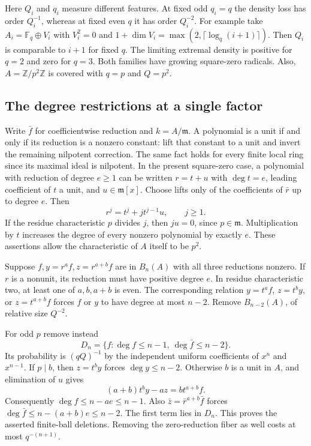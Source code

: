 Here $Q_i$ and $q_i$ measure different features. At fixed odd $q_i=q$ the density loss has order $Q_i^{-1}$, whereas at fixed even $q$ it has order $Q_i^{-2}$. For example take $A_i=\mathbb F_q\oplus V_i$ with $V_i^2=0$ and $1+\dim V_i=\max(2,\lceil\log_q(i+1)\rceil)$. Then $Q_i$ is comparable to $i+1$ for fixed $q$. The limiting extremal density is positive for $q=2$ and zero for $q=3$. Both families have growing square-zero radicals. Also, $A=\mathbb Z/p^2\mathbb Z$ is covered with $q=p$ and $Q=p^2$.

\subsection{The degree restrictions at a single factor}
Write $\bar f$ for coefficientwise reduction and $k=A/\mathfrak m$. A polynomial is a unit if and only if its reduction is a nonzero constant: lift that constant to a unit and invert the remaining nilpotent correction. The same fact holds for every finite local ring since its maximal ideal is nilpotent. In the present square-zero case, a polynomial with reduction of degree $e\ge1$ can be written $r=t+u$ with $\deg t=e$, leading coefficient of $t$ a unit, and $u\in\mathfrak m[x]$. Choose lifts only of the coefficients of $\bar r$ up to degree $e$. Then
\[
              r^j=t^j+j t^{j-1}u,\qquad j\ge1 .
\]
If the residue characteristic $p$ divides $j$, then $ju=0$, since $p\in\mathfrak m$. Multiplication by $t$ increases the degree of every nonzero polynomial by exactly $e$. These assertions allow the characteristic of $A$ itself to be $p^2$.

Suppose $f,y=r^af,z=r^{a+b}f$ are in $B_n(A)$ with all three reductions nonzero. If $r$ is a nonunit, its reduction must have positive degree $e$. In residue characteristic two, at least one of $a,b,a+b$ is even. The corresponding relation $y=t^a f$, $z=t^b y$, or $z=t^{a+b}f$ forces $f$ or $y$ to have degree at most $n-2$. Remove $B_{n-2}(A)$, of relative size $Q^{-2}$.

For odd $p$ remove instead
\[
        D_n=\{f:\deg f\le n-1,\ \deg\bar f\le n-2\}.
\]
Its probability is $(qQ)^{-1}$ by the independent uniform coefficients of $x^n$ and $x^{n-1}$. If $p\mid b$, then $z=t^b y$ forces $\deg y\le n-2$. Otherwise $b$ is a unit in $A$, and elimination of $u$ gives
\begin{equation}\label{eq:eliminate}
       (a+b)t^b y-a z=b t^{a+b} f .
\end{equation}
Consequently $\deg f\le n-ae\le n-1$. Also $\bar z=\bar r^{a+b}\bar f$ forces $\deg\bar f\le n-(a+b)e\le n-2$. The first term lies in $D_n$. This proves the asserted finite-ball deletions. Removing the zero-reduction fiber as well costs at most $q^{-(n+1)}$.

